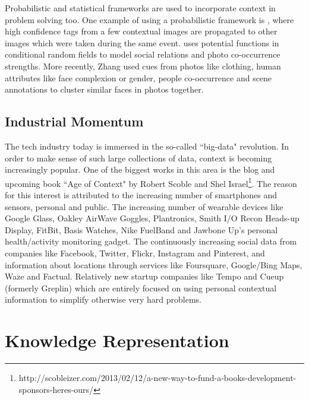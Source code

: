 Probabilistic and statistical frameworks are used to incorporate context in problem solving too. One example of using a probabilistic framework is \cite{cao2008annotating}, where high confidence tags from a few contextual images are propagated to other images which were taken during the same event. \cite{stone2008autotagging} uses potential functions in conditional random fields to model social relations and photo co-occurrence strengths. More recently, Zhang \cite{zhang2013unified} used cues from photos like clothing, human attributes like face complexion or gender, people co-occurrence and scene annotations to cluster similar faces in photos together.

\subsection{Industrial Momentum}
The tech industry today is immersed in the so-called ``big-data" revolution. In order to make sense of such large collections of data, context is becoming increasingly popular. One of the biggest works in this area is the blog and upcoming book ``Age of Context" by Robert Scoble and Shel Israel\footnote{http://scobleizer.com/2013/02/12/a-new-way-to-fund-a-books-development-sponsors-heres-ours/}. The reason for this interest is attributed to the increasing number of smartphones and sensors, personal and public. The increasing number of wearable devices like Google Glass, Oakley AirWave Goggles, Plantronics, Smith I/O Recon Heads-up Display, FitBit, Basis Watches, Nike FuelBand  and Jawbone Up's personal health/activity monitoring gadget. The continuously increasing social data from companies like Facebook, Twitter, Flickr, Instagram and Pinterest, and information about locations through services like Foursquare, Google/Bing Maps, Waze and Factual. Relatively new startup companies like Tempo and Cueup (formerly Greplin) which are entirely focused on using personal contextual information to simplify otherwise very hard problems.

\section{Knowledge Representation}

